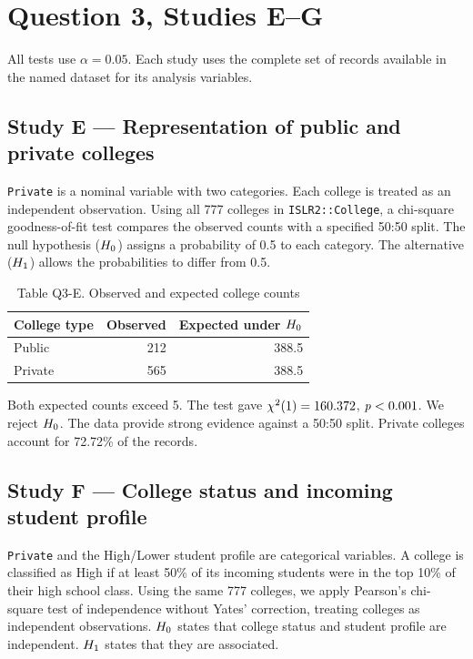 \section{Question 3, Studies E--G}

All tests use $\alpha = 0.05$. Each study uses the complete set of records available in the named dataset for its analysis variables.

\FloatBarrier
\subsection*{Study E --- Representation of public and private colleges}

\texttt{Private} is a nominal variable with two categories. Each college is treated as an independent observation. Using all 777 colleges in \texttt{ISLR2::College}, a chi-square goodness-of-fit test compares the observed counts with a specified 50:50 split. The null hypothesis ($H_0$) assigns a probability of 0.5 to each category. The alternative ($H_1$) allows the probabilities to differ from 0.5.

\begin{table}[htbp]
  \centering
  \caption*{Table Q3-E. Observed and expected college counts}
  \begin{tabular}{lrr}
    \toprule
    College type & Observed & Expected under $H_0$ \\
    \midrule
    Public & 212 & 388.5 \\
    Private & 565 & 388.5 \\
    \bottomrule
  \end{tabular}
\end{table}

Both expected counts exceed 5. The test gave $\chi^2(1) = 160.372$, $\mathit{p} < 0.001$. We reject $H_0$. The data provide strong evidence against a 50:50 split. Private colleges account for 72.72\% of the records.

\FloatBarrier
\subsection*{Study F --- College status and incoming student profile}

\texttt{Private} and the High/Lower student profile are categorical variables. A college is classified as High if at least 50\% of its incoming students were in the top 10\% of their high school class. Using the same 777 colleges, we apply Pearson's chi-square test of independence without Yates' correction, treating colleges as independent observations. $H_0$ states that college status and student profile are independent. $H_1$ states that they are associated.

